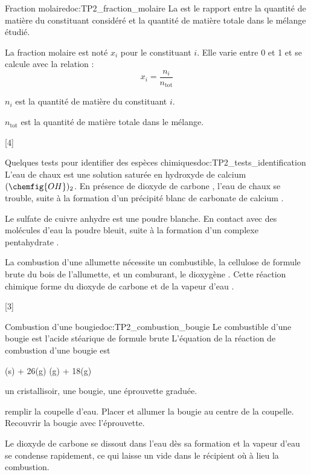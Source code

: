 \begin{doc}{Fraction molaire}{doc:TP2_fraction_molaire}
  La  est le rapport entre la quantité de matière du constituant considéré et la quantité de matière totale dans le mélange étudié.

  La fraction molaire est noté $x_i$ pour le constituant $i$. Elle varie entre 0 et 1 et se calcule avec la relation :
  \begin{equation*}
    x_i = \dfrac{n_i}{n_\text{tot}}
  \end{equation*}

  $n_i$ est la quantité de matière du constituant $i$.

  $n_\text{tot}$ est la quantité de matière totale dans le mélange.
\end{doc}

[4]


\begin{doc}{Quelques tests pour identifier des espèces chimiques}{doc:TP2_tests_identification}
  \pointCyan L'eau de chaux est une solution saturée en hydroxyde de calcium  $(\chemfig{OH})_2$.
  En présence de dioxyde de carbone , l'eau de chaux se trouble, suite à la formation d'un précipité blanc de carbonate de calcium .

  \pointCyan Le sulfate de cuivre anhydre  est une poudre blanche.
  En contact avec des molécules d'eau  la poudre bleuit, suite à la formation d'un complexe pentahydrate .

  \pointCyan La combustion d'une allumette nécessite un combustible, la cellulose de formule brute  du bois de l'allumette, et un comburant, le dioxygène .
  Cette réaction chimique forme du dioxyde de carbone  et de la vapeur d'eau .
\end{doc}

[3]


\begin{doc}{Combustion d'une bougie}{doc:TP2_combustion_bougie}
  Le combustible d'une bougie est l'acide stéarique de formule brute 
  L'équation de la réaction de combustion d'une bougie est
  \begin{center}
    (s) + 26(g) (g) + 18(g)
  \end{center}

   un cristallisoir, une bougie, une éprouvette graduée.

   remplir la coupelle d'eau.
  Placer et allumer la bougie au centre de la coupelle.
  Recouvrir la bougie avec l'éprouvette.

  Le dioxyde de carbone se dissout dans l'eau dès sa formation et la vapeur d'eau se condense rapidement, ce qui laisse un vide dans le récipient où à lieu la combustion.
\end{doc}

